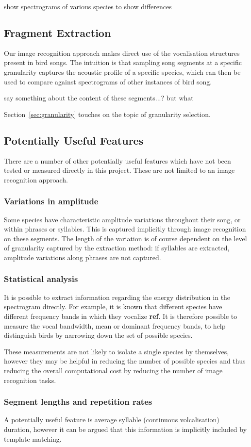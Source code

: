 show spectrograms of various species to show differences


\subsection{Fragment Extraction}
Our image recognition approach makes direct use of the vocalisation structures
present in bird songs.
The intuition is that sampling song segments at a specific granularity captures
the acoustic profile of a specific species, which can then be used to compare
against spectrograms of other instances of bird song.

say something about the content of these segments...? but what

Section~\ref{sec:granularity} touches on the topic of granularity selection.



\subsection{Potentially Useful Features}
There are a number of other potentially useful features which have not been
tested or measured directly in this project.
These are not limited to an image recognition approach.

\subsubsection{Variations in amplitude}
Some species have characteristic amplitude variations throughout their song,
or within phrases or syllables.
This is captured implicitly through image recognition on these segments.
The length of the variation is of course dependent on the level of granularity
captured by the extraction method: if syllables are extracted, amplitude
variations along phrases are not captured.

\subsubsection{Statistical analysis}
It is possible to extract information regarding the energy distribution in the
spectrogram directly.
For example, it is known that different species have different frequency bands
in which they vocalize \textbf{ref}.
It is therefore possible to measure the vocal bandwidth, mean or dominant
frequency bands, to help distinguish birds by narrowing down the set of
possible species.

These measurements are not likely to isolate a single species by themselves,
however they may be helpful in reducing the number of possible species and thus
reducing the overall computational cost by reducing the number of image
recognition tasks.

\subsubsection{Segment lengths and repetition rates}
A potentially useful feature is average syllable (continuous volcalisation)
duration, however it can be argued that this information is implicitly included
by template matching.
